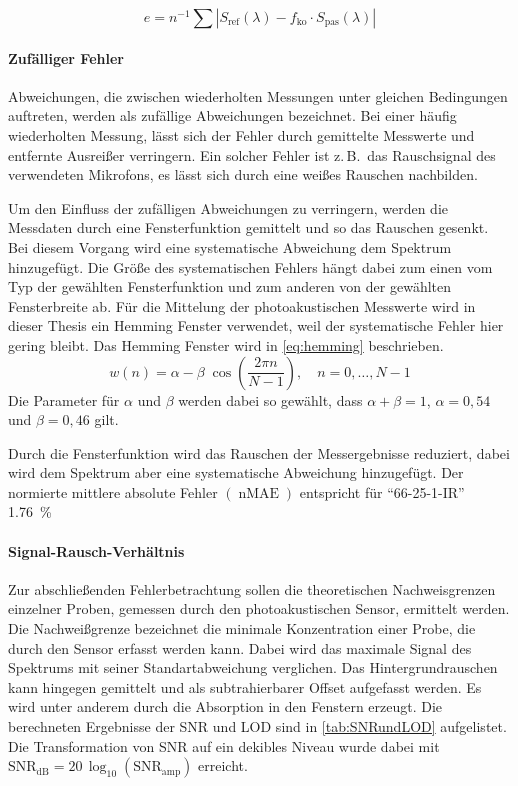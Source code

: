\begin{equation}
    e = n^{-1}\sum \left| S_\mathrm{ref}(\lambda) - f_\mathrm{ko} \cdot S_\mathrm{pas}(\lambda) \right|
\end{equation}

\paragraph{Zufälliger Fehler}
Abweichungen, die zwischen wiederholten Messungen unter gleichen Bedingungen auftreten, werden als zufällige Abweichungen bezeichnet.
Bei einer häufig wiederholten Messung, lässt sich der Fehler durch gemittelte Messwerte und entfernte Ausreißer verringern.
Ein solcher Fehler ist z.\,B.\ das Rauschsignal des verwendeten Mikrofons, es lässt sich durch eine weißes Rauschen nachbilden.

Um den Einfluss der zufälligen Abweichungen zu verringern, werden die Messdaten durch eine Fensterfunktion gemittelt und so das Rauschen gesenkt.
Bei diesem Vorgang wird eine systematische Abweichung dem Spektrum hinzugefügt.
Die Größe des systematischen Fehlers hängt dabei zum einen vom Typ der gewählten Fensterfunktion und zum anderen von der gewählten Fensterbreite ab.
Für die Mittelung der photoakustischen Messwerte wird in dieser Thesis ein Hemming Fenster verwendet, weil der systematische Fehler hier gering bleibt.
Das Hemming Fenster wird in \cref{eq:hemming} beschrieben.
\begin{equation} \label{eq:hemming}
    {\displaystyle w(n)=\alpha -\beta \;\cos \left({\frac {2\pi n}{N-1}}\right),\quad n=0,\dotsc ,N-1}
\end{equation}
Die Parameter für $\alpha$ und $\beta$ werden dabei so gewählt, dass $\alpha + \beta = 1$, $\alpha = 0,54$ und $\beta = 0,46$ gilt.

Durch die Fensterfunktion wird das Rauschen der Messergebnisse reduziert, dabei wird dem Spektrum aber eine systematische Abweichung hinzugefügt.
Der normierte mittlere absolute Fehler $(\operatorname{nMAE})$ entspricht für \enquote{66-25-1-IR} \SI{1.76}{\percent}


\paragraph{Signal-Rausch-Verhältnis}
Zur abschließenden Fehlerbetrachtung sollen die theoretischen Nachweisgrenzen einzelner Proben, gemessen durch den photoakustischen Sensor, ermittelt werden.
Die Nachweißgrenze bezeichnet die minimale Konzentration einer Probe, die durch den Sensor erfasst werden kann.
Dabei wird das maximale Signal des Spektrums mit seiner Standartabweichung verglichen.
Das Hintergrundrauschen kann hingegen gemittelt und als subtrahierbarer Offset aufgefasst werden.
Es wird unter anderem durch die Absorption in den Fenstern erzeugt.
Die berechneten Ergebnisse der \gls{SNR} und \gls{LOD} sind in \cref{tab:SNRundLOD} aufgelistet.
Die Transformation von \gls{SNR} auf ein dekibles Niveau wurde dabei mit $\mathrm{SNR}_\mathrm{dB} = 20\, \operatorname{log}_{10}(\mathrm{SNR}_\mathrm{amp})$ erreicht.

